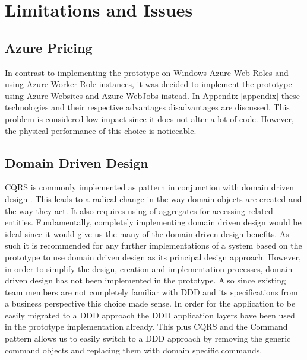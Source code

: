 \section{Limitations and Issues}
\subsection{Azure Pricing}
In contrast to implementing the prototype on Windows Azure Web Roles and using Azure Worker Role instances, it was decided to implement the prototype using Azure Websites and Azure WebJobs instead. In Appendix \ref{appendix} these technologies and their respective advantages disadvantages are discussed. This problem is considered low impact since it does not alter a lot of code. However, the physical performance of this choice is noticeable.

\subsection{Domain Driven Design}
CQRS  is commonly implemented as pattern in conjunction with domain driven design \cite{Swanson}. This leads to a radical change in the way domain objects are created and the way they act. It also requires using of aggregates for accessing related entities. Fundamentally, completely implementing domain driven design would be ideal since it would give us the many of the domain driven design benefits. As such it is recommended for any further implementations of a system based on the prototype to use domain driven design as its principal design approach. However, in order to simplify the design, creation and implementation processes, domain driven design has not been implemented in the prototype. Also since existing team members are not completely familiar with DDD and its specifications from a business perspective this choice made sense. In order for the application to be easily migrated to a DDD approach the DDD application layers have been used in the prototype implementation already. This plus CQRS and the Command pattern  allows us to easily switch to a DDD approach by removing the generic command objects and replacing them with domain specific commands.

